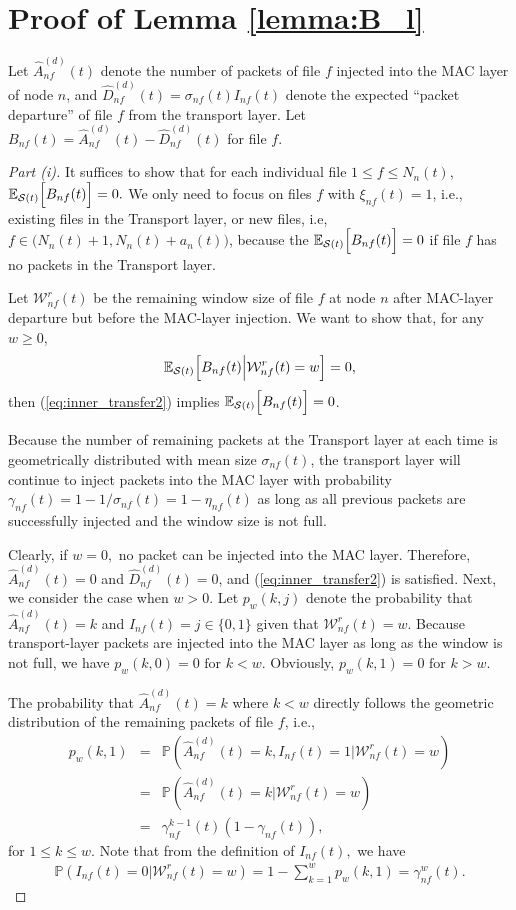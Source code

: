 \documentclass[10pt,onecolumn,draftclsnofoot,journal]{IEEEtran}
\newcommand{\mW} {\mathcal{W}}
\newcommand{\hA}{\hat{A}_{nf}^{(d)}(t)}
\newcommand{\hD}{\hat{D}_{nf}^{(d)}(t)}
\newcommand{\expectS}[1]{{\mathbb E_{\mathcal{S}(t)}} \Bigl[ #1\Bigr]}
\newcommand{\prob}[1]{{\mathbb P} \left( #1\right)}
\begin{document}
\section{Proof of Lemma \ref{lemma:B_l}}
Let $\hat{A}_{nf}^{(d)}(t)$ denote the number of packets of file $f$ injected into the MAC layer of node $n$, and $\hat{D}_{nf}^{(d)}(t) = \sigma_{nf}(t)I_{nf}(t)$ denote the expected ``packet departure'' of file $f$ from the transport layer. Let $B_{nf}(t) = \hA- \hD$ for file $f$.
\begin{proof}[Part (i)]
It suffices to show that for each individual file $1 \leq f \leq N_n(t)$,
$
\expectS{B_{nf}(t)}=0.
$
We only need to focus on files $f$ with $ \xi_{nf}(t)=1$, i.e., existing files in the Transport layer, or new files, i.e, $f \in \bigl(N_n(t)+1, N_n(t) + a_n(t) \bigr)$, because the $\expectS{B_{nf}(t)}=0$ if file $f$ has no packets in the Transport layer.

Let $\mW_{nf}^r(t)$ be the remaining window size of file $f$ at node $n$ after MAC-layer departure but before the MAC-layer injection. We want to show that, for any $w \ge 0$,
\begin{eqnarray}\label{eq:inner_transfer2}
\expectS{B_{nf}(t) \Bigl| \mW_{nf}^r(t) =w }=0,
\end{eqnarray}
then (\ref{eq:inner_transfer2}) implies $\expectS{B_{nf}(t)}=0$.

Because the number of remaining packets at the Transport layer at each time is geometrically distributed with mean size $\sigma_{nf}(t)$, the transport layer will continue to inject packets into the MAC layer with probability $\gamma_{nf}(t) = 1-1/\sigma_{nf}(t)=1-\eta_{nf}(t)$ as long as all previous packets are successfully injected and the window size is not full.

Clearly, if $w=0,$ no packet can be injected into the MAC layer. Therefore, $\hA=0$ and $\hD=0$, and (\ref{eq:inner_transfer2}) is satisfied. Next, we consider the case when $w>0$.
Let $p_w(k,j)$ denote the probability that $\hA=k$ and $I_{nf}(t)=j\in\{0,1\}$ given that $\mW_{nf}^r(t)=w$. Because transport-layer packets are injected into the MAC layer as long as the window is not full, we have $p_w(k,0)=0 \mbox{ for } k <w.$ Obviously, $p_w(k,1)=0 \mbox{ for } k>w.$

The probability that $\hA = k$ where $k < w$ directly follows the geometric distribution of the remaining packets of file $f$, i.e.,
\begin{eqnarray*}
 p_w(k,1) & = & \prob{\hA=k, I_{nf}(t) = 1 | \mW_{nf}^r(t)=w} \\
  &= & \prob{\hA=k | \mW_{nf}^r(t)=w} \\
  &= & \gamma_{nf}^{k-1}(t) (1- \gamma_{nf}(t)),
\end{eqnarray*}
for $1 \le k \leq w$.
Note that from the definition of $I_{nf}(t),$ we have
\begin{eqnarray*}
\prob{I_{nf}(t) = 0 | \mW_{nf}^r(t)=w} = 1 - \sum_{k=1}^w p_w(k,1)  = \gamma_{nf}^w(t).
\end{eqnarray*}


\end{proof}
\end{document}

